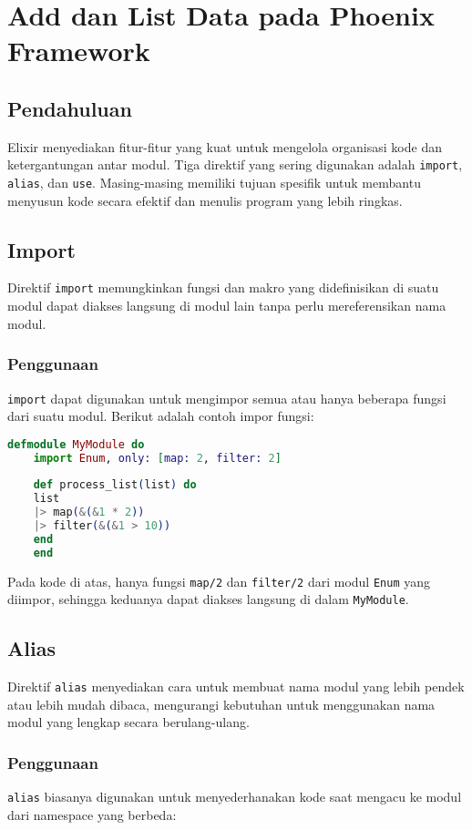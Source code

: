 \chapter{Add dan List Data pada Phoenix Framework}

\section{Pendahuluan}
Elixir menyediakan fitur-fitur yang kuat untuk mengelola organisasi kode dan ketergantungan antar modul. Tiga direktif yang sering digunakan adalah \texttt{import}, \texttt{alias}, dan \texttt{use}. Masing-masing memiliki tujuan spesifik untuk membantu menyusun kode secara efektif dan menulis program yang lebih ringkas.

\section{Import}
Direktif \texttt{import} memungkinkan fungsi dan makro yang didefinisikan di suatu modul dapat diakses langsung di modul lain tanpa perlu mereferensikan nama modul.

\subsection{Penggunaan}
\texttt{import} dapat digunakan untuk mengimpor semua atau hanya beberapa fungsi dari suatu modul. Berikut adalah contoh impor fungsi:

\begin{lstlisting}[language=Elixir]
	defmodule MyModule do
	import Enum, only: [map: 2, filter: 2]
	
	def process_list(list) do
	list
	|> map(&(&1 * 2))
	|> filter(&(&1 > 10))
	end
	end
\end{lstlisting}

Pada kode di atas, hanya fungsi \texttt{map/2} dan \texttt{filter/2} dari modul \texttt{Enum} yang diimpor, sehingga keduanya dapat diakses langsung di dalam \texttt{MyModule}.

\section{Alias}
Direktif \texttt{alias} menyediakan cara untuk membuat nama modul yang lebih pendek atau lebih mudah dibaca, mengurangi kebutuhan untuk menggunakan nama modul yang lengkap secara berulang-ulang.

\subsection{Penggunaan}
\texttt{alias} biasanya digunakan untuk menyederhanakan kode saat mengacu ke modul dari namespace yang berbeda:

